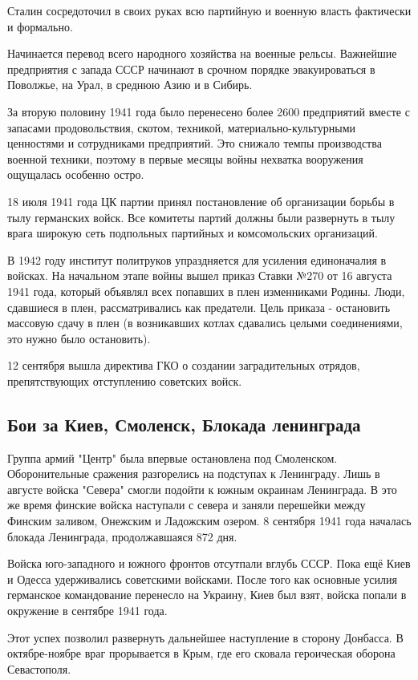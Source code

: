 Сталин сосредоточил в своих руках всю партийную и военную власть фактически и формально.

Начинается перевод всего народного хозяйства на военные рельсы. Важнейшие предприятия с запада СССР начинают в срочном порядке эвакуироваться в Поволжье, на Урал, в среднюю Азию и в Сибирь.

За вторую половину 1941 года было перенесено более 2600 предприятий вместе с запасами продовольствия, скотом, техникой, материально-культурными ценностями и сотрудниками предприятий. Это снижало темпы производства военной техники, поэтому в первые месяцы войны нехватка вооружения ощущалась особенно остро.

18 июля 1941 года ЦК партии принял постановление об организации борьбы в тылу германских войск. Все комитеты партий должны были развернуть в тылу врага широкую сеть подпольных партийных и комсомольских организаций.

В 1942 году институт политруков упраздняется для усиления единоначалия в войсках. На начальном этапе войны вышел приказ Ставки №270 от 16 августа 1941 года, который объявлял всех попавших в плен изменниками Родины. Люди, сдавшиеся в плен, рассматривались как предатели. Цель приказа - остановить массовую сдачу в плен (в возникавших котлах сдавались целыми соединениями, это нужно было остановить).

12 сентября вышла директива ГКО о создании заградительных отрядов, препятствующих отступлению советских войск.
\subsection{Бои за Киев, Смоленск, Блокада ленинграда}
Группа армий "Центр" была впервые остановлена под Смоленском. Оборонительные сражения разгорелись на подступах к Ленинграду. Лишь в августе войска "Севера" смогли подойти к южным окраинам Ленинграда. В это же время финские войска наступали с севера и заняли перешейки между Финским заливом, Онежским и Ладожским озером. 8 сентября 1941 года началась блокада Ленинграда, продолжавшаяся 872 дня.

Войска юго-западного и южного фронтов отсутпали вглубь СССР. Пока ещё Киев и Одесса удерживались советскими войсками. После того как основные усилия германское командование перенесло на Украину, Киев был взят, войска попали в окружение в сентябре 1941 года.

Этот успех позволил развернуть дальнейшее наступление в сторону Донбасса. В октябре-ноябре враг прорывается в Крым, где его сковала героическая оборона Севастополя.

